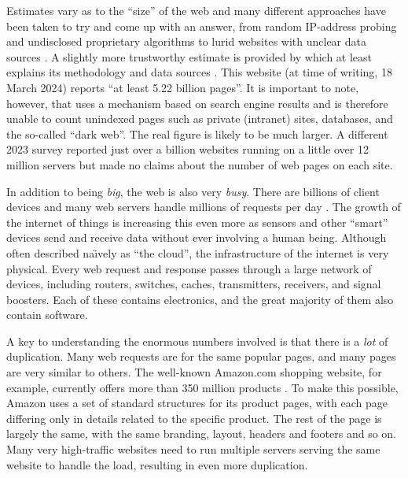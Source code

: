 \label{A17}
Estimates vary as to the \enquote{size} of the web and many different approaches have been taken to try and come up with an answer, from random IP-address probing \citep{Xing2003} and undisclosed proprietary algorithms \citep{Murray2000} to lurid websites with unclear data sources \citep{LiveCounter2018}. A slightly more trustworthy estimate is provided by \citet{Worldwidewebsize2018} which at least explains its methodology and data sources \citep{Kunder2008}. This website (at time of writing, 18 March 2024) reports \enquote{at least 5.22 billion pages}. It is important to note, however, that \citet{Worldwidewebsize2018} uses a mechanism based on search engine results and is therefore unable to count unindexed pages such as private (\gls{intranet}) sites, databases, and the so-called \enquote{\gls{dark web}}. The real figure is likely to be much larger. A different 2023 survey reported just over a billion websites running on a little over 12 million servers \citep{Netcraft2023} but made no claims about the number of web pages on each site.

In addition to being \emph{big}, the web is also very \emph{busy}. There are billions of client devices and many web servers handle millions of requests per day \citep{Cisco2020}. The growth of the \gls{internet of things} is increasing this even more as sensors and other \enquote{smart} devices send and receive data without ever involving a human being. Although often described na\"{\i}vely as \enquote{\gls{the cloud}}, the infrastructure of the internet is very physical. Every web request and response passes through a large network of devices, including routers, switches, caches, transmitters, receivers, and signal boosters. Each of these contains electronics, and the great majority of them also contain software.

A key to understanding the enormous numbers involved is that there is a \emph{lot} of duplication. Many web requests are for the same popular pages, and many pages are very similar to others. The well-known Amazon.com shopping website, for example, currently offers more than 350 million products \citep{SellerApp2023}. To make this possible, Amazon uses a set of standard structures for its product pages, with each page differing only in details related to the specific product. The rest of the page is largely the same, with the same branding, layout, headers and footers and so on. Many very high-traffic websites need to run multiple servers serving the same website to handle the load, resulting in even more duplication.

